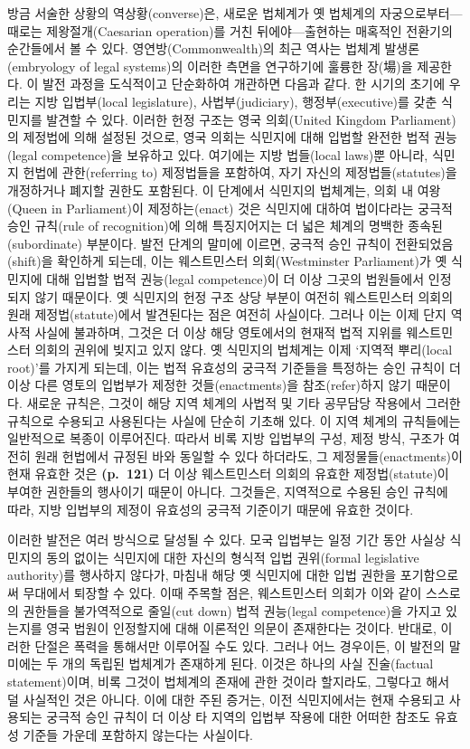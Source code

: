 방금 서술한 상황의 역상황(converse)은, 새로운 법체계가 옛 법체계의
자궁으로부터---때로는 제왕절개(Caesarian operation)를 거친
뒤에야---출현하는 매혹적인 전환기의 순간들에서 볼 수 있다.
영연방(Commonwealth)의 최근 역사는 법체계 발생론(embryology of legal
systems)의 이러한 측면을 연구하기에 훌륭한 장(場)을 제공한다. 이 발전
과정을 도식적이고 단순화하여 개관하면 다음과 같다. 한 시기의 초기에
우리는 지방 입법부(local legislature), 사법부(judiciary),
행정부(executive)를 갖춘 식민지를 발견할 수 있다. 이러한 헌정 구조는
영국 의회(United Kingdom Parliament)의 제정법에 의해 설정된 것으로, 영국
의회는 식민지에 대해 입법할 완전한 법적 권능(legal competence)을
보유하고 있다. 여기에는 지방 법들(local laws)뿐 아니라, 식민지 헌법에
관한(referring to) 제정법들을 포함하여, 자기 자신의 제정법들(statutes)을
개정하거나 폐지할 권한도 포함된다. 이 단계에서 식민지의 법체계는, 의회
내 여왕(Queen in Parliament)이 제정하는(enact) 것은  식민지에 대하여 법이다라는 궁극적 승인 규칙(rule
of recognition)에 의해 특징지어지는 더 넓은 체계의 명백한
종속된(subordinate) 부분이다. 발전 단계의 말미에 이르면, 궁극적 승인
규칙이 전환되었음(shift)을 확인하게 되는데, 이는 웨스트민스터
의회(Westminster Parliament)가 옛 식민지에 대해 입법할 법적 권능(legal
competence)이 더 이상 그곳의 법원들에서 인정되지 않기 때문이다. 옛
식민지의 헌정 구조 상당 부분이 여전히 웨스트민스터 의회의 원래
제정법(statute)에서 발견된다는 점은 여전히 사실이다. 그러나 이는 이제
단지 역사적 사실에 불과하며, 그것은 더 이상 해당 영토에서의 현재적 법적
지위를 웨스트민스터 의회의 권위에 빚지고 있지 않다. 옛 식민지의 법체계는
이제 ‘지역적 뿌리(local root)’를 가지게 되는데, 이는 법적 유효성의
궁극적 기준들을 특정하는 승인 규칙이 더 이상 다른 영토의 입법부가 제정한
것들(enactments)을 참조(refer)하지 않기 때문이다. 새로운 규칙은, 그것이
해당 지역 체계의 사법적 및 기타 공무담당 작용에서 그러한 규칙으로
수용되고 사용된다는 사실에 단순히 기초해 있다. 이 지역 체계의 규칙들에는
일반적으로 복종이 이루어진다. 따라서 비록 지방 입법부의 구성, 제정 방식,
구조가 여전히 원래 헌법에서 규정된 바와 동일할 수 있다 하더라도, 그
제정물들(enactments)이 현재 유효한 것은 \textbf{(p.~121)} 더 이상
웨스트민스터 의회의 유효한 제정법(statute)이 부여한 권한들의 행사이기
때문이 아니다. 그것들은, 지역적으로 수용된 승인 규칙에 따라, 지방
입법부의 제정이 유효성의 궁극적 기준이기 때문에 유효한 것이다.

이러한 발전은 여러 방식으로 달성될 수 있다. 모국 입법부는 일정 기간 동안
사실상 식민지의 동의 없이는 식민지에 대한 자신의 형식적 입법 권위(formal
legislative authority)를 행사하지 않다가, 마침내 해당 옛 식민지에 대한
입법 권한을 포기함으로써 무대에서 퇴장할 수 있다. 이때 주목할 점은,
웨스트민스터 의회가 이와 같이 스스로의 권한들을 불가역적으로 줄일(cut
down) 법적 권능(legal competence)을 가지고 있는지를 영국 법원이
인정할지에 대해 이론적인 의문이 존재한다는 것이다. 반대로, 이러한 단절은
폭력을 통해서만 이루어질 수도 있다. 그러나 어느 경우이든, 이 발전의
말미에는 두 개의 독립된 법체계가 존재하게 된다. 이것은 하나의 사실
진술(factual statement)이며, 비록 그것이 법체계의 존재에 관한 것이라
할지라도, 그렇다고 해서 덜 사실적인 것은 아니다. 이에 대한 주된 증거는,
이전 식민지에서는 현재 수용되고 사용되는 궁극적 승인 규칙이 더 이상 타
지역의 입법부 작용에 대한 어떠한 참조도 유효성 기준들 가운데 포함하지
않는다는 사실이다.

